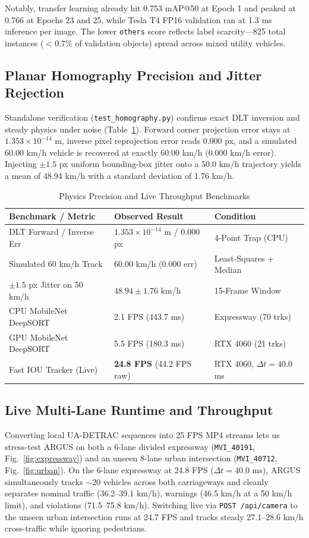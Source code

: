\documentclass[conference]{IEEEtran}
\begin{document}
Notably, transfer learning already hit 0.753 mAP@50 at Epoch 1 and peaked at 0.766 at Epochs 23 and 25, while Tesla T4 FP16 validation ran at 1.3 ms inference per image. The lower \texttt{others} score reflects label scarcity---825 total instances ($<0.7\%$ of validation objects) spread across mixed utility vehicles.

\subsection{Planar Homography Precision and Jitter Rejection}
Standalone verification (\texttt{test\_homography.py}) confirms exact DLT inversion and steady physics under noise (Table~\ref{tab:bench}). Forward corner projection error stays at $1.353\times 10^{-14}$ m, inverse pixel reprojection error reads 0.000 px, and a simulated 60.00 km/h vehicle is recovered at exactly 60.00 km/h (0.000 km/h error). Injecting $\pm 1.5$ px uniform bounding-box jitter onto a 50.0 km/h trajectory yields a mean of 48.94 km/h with a standard deviation of 1.76 km/h.

\begin{table}[t]
\centering
\caption{Physics Precision and Live Throughput Benchmarks}
\label{tab:bench}
\begin{tabular}{lll}
\toprule
Benchmark / Metric & Observed Result & Condition \\
\midrule
DLT Forward / Inverse Err & $1.353\times 10^{-14}$ m / 0.000 px & 4-Point Trap (CPU) \\
Simulated 60 km/h Track & 60.00 km/h (0.000 err) & Least-Squares + Median \\
$\pm 1.5$ px Jitter on 50 km/h & $48.94 \pm 1.76$ km/h & 15-Frame Window \\
\midrule
CPU MobileNet DeepSORT & 2.1 FPS (443.7 ms) & Expressway (70 trks) \\
GPU MobileNet DeepSORT & 5.5 FPS (180.3 ms) & RTX 4060 (21 trks) \\
Fast IOU Tracker (Live) & \textbf{24.8 FPS} (44.2 FPS raw) & RTX 4060, $\Delta t=40.0$ ms \\
\bottomrule
\end{tabular}
\end{table}

\subsection{Live Multi-Lane Runtime and Throughput}
Converting local UA-DETRAC sequences into 25 FPS MP4 streams lets us stress-test ARGUS on both a 6-lane divided expressway (\texttt{MVI\_40191}, Fig.~\ref{fig:expressway}) and an unseen 8-lane urban intersection (\texttt{MVI\_40712}, Fig.~\ref{fig:urban}). On the 6-lane expressway at 24.8 FPS ($\Delta t = 40.0$ ms), ARGUS simultaneously tracks $\sim$20 vehicles across both carriageways and cleanly separates nominal traffic (36.2--39.1 km/h), warnings (46.5 km/h at a 50 km/h limit), and violations (71.5--75.8 km/h). Switching live via \texttt{POST /api/camera} to the unseen urban intersection runs at 24.7 FPS and tracks steady 27.1--28.6 km/h cross-traffic while ignoring pedestrians.
\end{document}
